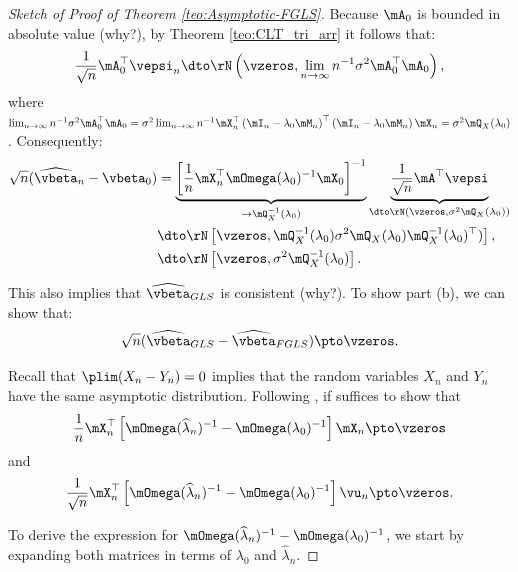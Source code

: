 \documentclass[english,12pt]{book}\usepackage[]{graphicx}\usepackage[]{xcolor}
\begin{document}
\begin{proof}[Sketch of Proof of Theorem \ref{teo:Asymptotic-FGLS}]
Because $\mA_0$ is bounded in absolute value (why?), by Theorem \ref{teo:CLT_tri_arr} it follows that:
\begin{equation*}
\frac{1}{\sqrt{n}}\mA^\top_0\vepsi_n  \dto \rN\left(\vzeros, \lim_{n\to\infty}n^{-1}\sigma^2\mA^\top_0\mA_0\right), 
\end{equation*}
%
where  $\lim_{n\to\infty}n^{-1}\sigma^2\mA^\top_0\mA_0 = \sigma^2\lim_{n\to\infty}n^{-1}\mX^\top_n\left(\mI_n - \lambda_0\mM_n\right)^\top\left(\mI_n - \lambda_0\mM_n\right)\mX_n=\sigma^2\mQ_X(\lambda_0)$. Consequently:
\begin{equation*}
  \begin{aligned}
  \sqrt{n}(\widehat{\vbeta}_n - \vbeta_0) & =  \underbrace{\left[\frac{1}{n}\mX^\top_n\mOmega(\lambda_0)^{-1}\mX_0\right]^{-1}}_{\to \mQ_X^{-1}(\lambda_0)}\underbrace{\frac{1}{\sqrt{n}}\mA^\top\vepsi}_{\dto \rN(\vzeros, \sigma^2\mQ_X(\lambda_0))} \\
   & \dto \rN\left[\vzeros, \mQ_X^{-1}(\lambda_0)\sigma^2\mQ_X(\lambda_0)\mQ_X^{-1}(\lambda_0)^\top)\right], \\
   & \dto \rN\left[\vzeros, \sigma^2\mQ_X^{-1}(\lambda_0)\right].
  \end{aligned}
\end{equation*}

This also implies that $\widehat{\vbeta}_{GLS}$ is consistent (why?). To show part (b), we can show that:
\begin{equation*}
  \sqrt{n}(\widehat{\vbeta}_{GLS} - \widehat{\vbeta}_{FGLS}) \pto \vzeros.
\end{equation*}

Recall that $\plim(X_n- Y_n) = 0$ implies that the random variables $X_n$ and $Y_n$ have the same asymptotic distribution. Following \cite{kelejian1999generalized}, if suffices to show that 
\begin{equation}\label{eq:omega-omega}
\frac{1}{n}\mX^\top_n\left[\mOmega(\widehat{\lambda}_n)^{-1}- \mOmega(\lambda_0)^{-1}\right]\mX_n\pto \vzeros
\end{equation}
%
and
\begin{equation*}
\frac{1}{\sqrt{n}}\mX^\top_n\left[\mOmega(\widehat{\lambda}_n)^{-1}- \mOmega(\lambda_0)^{-1}\right]\vu_n\pto \vzeros.
\end{equation*}


To derive the expression for \(\mOmega(\widehat{\lambda}_n)^{-1} - \mOmega(\lambda_0)^{-1}\), we start by expanding both matrices in terms of \( \lambda_0\) and \(\widehat{\lambda}_n\).


\end{proof}
\end{document}
